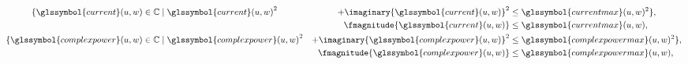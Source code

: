 \begin{alignat}{2}
    \{
        \glssymbol{current}(\vertexa,\vertexc)
        \in
        \complexes
    &\mid
        \real{\glssymbol{current}(\vertexa,\vertexc)}^2
    &+
        \imaginary{\glssymbol{current}(\vertexa,\vertexc)}^2
    &\leq
        \glssymbol{currentmax}(\vertexa,\vertexc)^2
    \},
    \label{ch:foundations:sec:power-flow-analyses:eq:network:bounds:current-flow}
    \\
    &&
    \fmagnitude{\glssymbol{current}(\vertexa,\vertexc)} 
    &\leq 
    \glssymbol{currentmax}(\vertexa,\vertexc),
    \label{ch:foundations:sec:power-flow-analyses:eq:network:bounds:current-flow:polar}
    \\
    \{ 
        \glssymbol{complexpower}(\vertexa,\vertexc)
        \in
        \complexes
    &\mid
        \real{\glssymbol{complexpower}(\vertexa,\vertexc)}^2 
    &+ 
        \imaginary{\glssymbol{complexpower}(\vertexa,\vertexc)}^2 
    &\leq
        \glssymbol{complexpowermax}(\vertexa,\vertexc)^2
    \},
    \label{ch:foundations:sec:power-flow-analyses:eq:network:bounds:complex-power-flow}
    \\
    &&
    \fmagnitude{\glssymbol{complexpower}(\vertexa,\vertexc)} 
    &\leq 
    \glssymbol{complexpowermax}(\vertexa,\vertexc),
    \label{ch:foundations:sec:power-flow-analyses:eq:network:bounds:complex-power:rectangular}
\end{alignat}